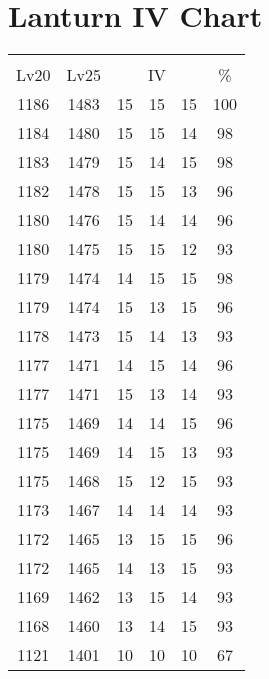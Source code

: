 \documentclass{article}%
\begin{document}
%
\normalsize%
\section{Lanturn IV Chart}%
\label{sec:Lanturn IV Chart}%
\renewcommand{\arraystretch}{1.5}%
\begin{tabular}{|c|c|c|c|c|c|}%
\hline%
\multicolumn{6}{|c|}{\textcolor{white}{ 
\linebreak{Lanturn}
}%
\cellcolor{black}}\\%
\multicolumn{1}{|c}{Lv20}&\multicolumn{1}{c|}{Lv25}&\multicolumn{3}{c|}{IV}&\multicolumn{1}{|c|}{\%}\\%
\hline%
\rowcolor{color100}%
1186&1483&15&15&15&100\\%
\hline%
\rowcolor{color98}%
1184&1480&15&15&14&98\\%
\hline%
\rowcolor{color98}%
1183&1479&15&14&15&98\\%
\hline%
\rowcolor{color96}%
1182&1478&15&15&13&96\\%
\hline%
\rowcolor{color96}%
1180&1476&15&14&14&96\\%
\hline%
\rowcolor{color93}%
1180&1475&15&15&12&93\\%
\hline%
\rowcolor{color98}%
1179&1474&14&15&15&98\\%
\hline%
\rowcolor{color96}%
1179&1474&15&13&15&96\\%
\hline%
\rowcolor{color93}%
1178&1473&15&14&13&93\\%
\hline%
\rowcolor{color96}%
1177&1471&14&15&14&96\\%
\hline%
\rowcolor{color93}%
1177&1471&15&13&14&93\\%
\hline%
\rowcolor{color96}%
1175&1469&14&14&15&96\\%
\hline%
\rowcolor{color93}%
1175&1469&14&15&13&93\\%
\hline%
\rowcolor{color93}%
1175&1468&15&12&15&93\\%
\hline%
\rowcolor{color93}%
1173&1467&14&14&14&93\\%
\hline%
\rowcolor{color96}%
1172&1465&13&15&15&96\\%
\hline%
\rowcolor{color93}%
1172&1465&14&13&15&93\\%
\hline%
\rowcolor{color93}%
1169&1462&13&15&14&93\\%
\hline%
\rowcolor{color93}%
1168&1460&13&14&15&93\\%
\hline%
\rowcolor{color91}%
1121&1401&10&10&10&67\\%
\end{tabular}

%
\end{document}
